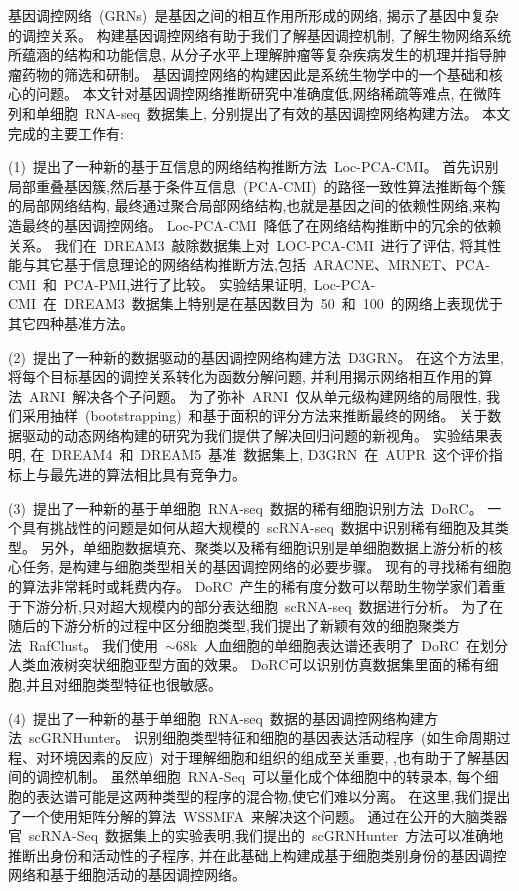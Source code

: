 \begin{abstractcn}
基因调控网络~(GRNs)~是基因之间的相互作用所形成的网络,
揭示了基因中复杂的调控关系。
构建基因调控网络有助于我们了解基因调控机制,
了解生物网络系统所蕴涵的结构和功能信息,
从分子水平上理解肿瘤等复杂疾病发生的机理并指导肿瘤药物的筛选和研制。
基因调控网络的构建因此是系统生物学中的一个基础和核心的问题。
本文针对基因调控网络推断研究中准确度低,网络稀疏等难点, 
在微阵列和单细胞~RNA-seq~数据集上, 分别提出了有效的基因调控网络构建方法。
本文完成的主要工作有:

(1)~提出了一种新的基于互信息的网络结构推断方法~Loc-PCA-CMI。
首先识别局部重叠基因簇,然后基于条件互信息~(PCA-CMI)~的路径一致性算法推断每个簇的局部网络结构,
最终通过聚合局部网络结构,也就是基因之间的依赖性网络,来构造最终的基因调控网络。
Loc-PCA-CMI~降低了在网络结构推断中的冗余的依赖关系。
我们在~DREAM3~敲除数据集上对~LOC-PCA-CMI~进行了评估,
将其性能与其它基于信息理论的网络结构推断方法,包括~ARACNE、MRNET、PCA-CMI~和~PCA-PMI,进行了比较。
实验结果证明,~Loc-PCA-CMI~在~DREAM3~数据集上特别是在基因数目为~50~和~100~的网络上表现优于其它四种基准方法。

(2)~提出了一种新的数据驱动的基因调控网络构建方法~D3GRN。
在这个方法里,将每个目标基因的调控关系转化为函数分解问题,
并利用揭示网络相互作用的算法~ARNI~解决各个子问题。
为了弥补~ARNI~仅从单元级构建网络的局限性,
我们采用抽样~(bootstrapping)~和基于面积的评分方法来推断最终的网络。
关于数据驱动的动态网络构建的研究为我们提供了解决回归问题的新视角。
实验结果表明, 在~DREAM4~和~DREAM5~基准~数据集上, D3GRN~在~AUPR~这个评价指标上与最先进的算法相比具有竞争力。

(3)~提出了一种新的基于单细胞~RNA-seq~数据的稀有细胞识别方法~DoRC。
一个具有挑战性的问题是如何从超大规模的~scRNA-seq~数据中识别稀有细胞及其类型。
另外，单细胞数据填充、聚类以及稀有细胞识别是单细胞数据上游分析的核心任务, 
是构建与细胞类型相关的基因调控网络的必要步骤。
现有的寻找稀有细胞的算法非常耗时或耗费内存。
DoRC~产生的稀有度分数可以帮助生物学家们着重于下游分析,只对超大规模内的部分表达细胞~scRNA-seq~数据进行分析。
为了在随后的下游分析的过程中区分细胞类型,我们提出了新颖有效的细胞聚类方法~RafClust。
我们使用~${\sim}68$k~人血细胞的单细胞表达谱还表明了~DoRC~在划分人类血液树突状细胞亚型方面的效果。
DoRC可以识别仿真数据集里面的稀有细胞,并且对细胞类型特征也很敏感。

(4)~提出了一种新的基于单细胞~RNA-seq~数据的基因调控网络构建方法~scGRNHunter。
识别细胞类型特征和细胞的基因表达活动程序~(如生命周期过程、对环境因素的反应)~对于理解细胞和组织的组成至关重要,
,也有助于了解基因间的调控机制。
虽然单细胞~RNA-Seq~可以量化成个体细胞中的转录本,
每个细胞的表达谱可能是这两种类型的程序的混合物,使它们难以分离。
在这里,我们提出了一个使用矩阵分解的算法~WSSMFA~来解决这个问题。
通过在公开的大脑类器官~scRNA-Seq~数据集上的实验表明,我们提出的~scGRNHunter~方法可以准确地推断出身份和活动性的子程序, 
并在此基础上构建成基于细胞类别身份的基因调控网络和基于细胞活动的基因调控网络。


\end{abstractcn}